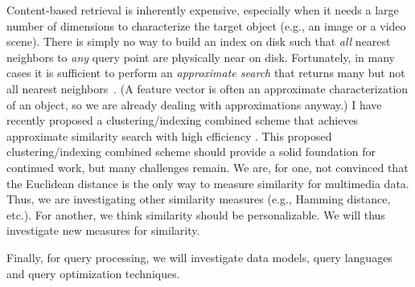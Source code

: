 Content-based retrieval 
is inherently expensive, especially when
it needs a large number of dimensions to characterize the
target object (e.g., an image or a video scene).  
There is simply no way to
build an index on disk such that {\em all} nearest neighbors to {\em
any} query point are physically near on disk.  
Fortunately, in many cases it is
sufficient to perform an {\em approximate search} that returns many
but not all nearest neighbors~\cite{AM94,Cla94,IM98,Jk97,KOR98}.  (A
feature vector is often an approximate characterization of an object,
so we are already dealing with approximations anyway.)  
I have recently proposed a
clustering/indexing combined scheme that achieves approximate
similarity search with high efficiency \cite{Lch99}.
This proposed clustering/indexing combined scheme should
provide a solid foundation for continued work,
but many challenges remain. We are, for one, not
convinced that the Euclidean distance
is the only way to measure similarity for multimedia data.
Thus, we are investigating other similarity measures
(e.g., Hamming distance, etc.). For another,
we think similarity should be personalizable.
We will thus investigate new measures for similarity.

Finally, 
for query processing, we will investigate 
data models, query languages and query optimization techniques.

%
%
%
%



